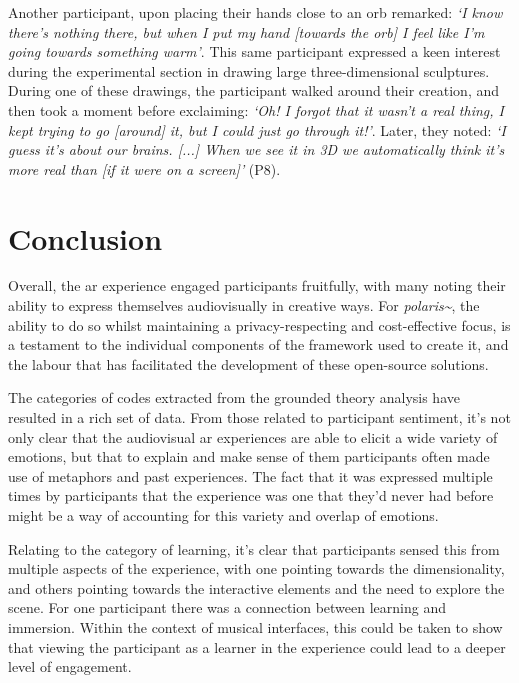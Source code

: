 Another participant, upon placing their hands close to an orb remarked: \textit{`I know there's nothing there, but when I put my hand [towards the orb] I feel like I'm going towards something warm'}. This same participant expressed a keen interest during the experimental section in drawing large three-dimensional sculptures. During one of these drawings, the participant walked around their creation, and then took a moment before exclaiming: \textit{`Oh! I forgot that it wasn't a real thing, I kept trying to go [around] it, but I could just go through it!'}. Later, they noted: \textit{`I guess it's about our brains. [...] When we see it in 3D we automatically think it's more real than [if it were on a screen]'} (P8).

\section{Conclusion}\label{sec: polaris-conclusion}
Overall, the \ac{ar} experience engaged participants fruitfully, with many noting their ability to express themselves audiovisually in creative ways. For \textit{polaris\textasciitilde{}}, the ability to do so whilst maintaining a privacy-respecting and cost-effective focus, is a testament to the individual components of the framework used to create it, and the labour that has facilitated the development of these open-source solutions.

The categories of codes extracted from the grounded theory analysis have resulted in a rich set of data. From those related to participant sentiment, it's not only clear that the audiovisual \ac{ar} experiences are able to elicit a wide variety of emotions, but that to explain and make sense of them participants often made use of metaphors and past experiences. The fact that it was expressed multiple times by participants that the experience was one that they'd never had before might be a way of accounting for this variety and overlap of emotions.

Relating to the category of learning, it's clear that participants sensed this from multiple aspects of the experience, with one pointing towards the dimensionality, and others pointing towards the interactive elements and the need to explore the scene. For one participant there was a connection between learning and immersion. Within the context of musical interfaces, this could be taken to show that viewing the participant as a learner in the experience could lead to a deeper level of engagement.

